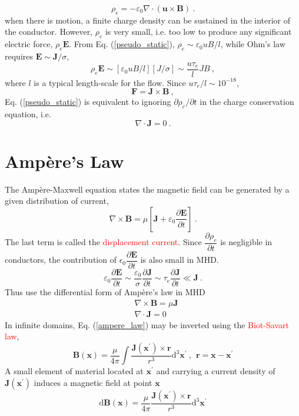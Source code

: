 \documentclass[12pt,a4paper]{article}
\renewcommand{\vec}[1]{\boldsymbol{#1}}
\newcommand{\dif}{\mathrm{d}}
\begin{document}
\begin{equation}
\rho_e = -\varepsilon_0 \nabla \cdot (\vec{u}\times \vec{B}) ~.
\label{pseudo_static}
\end{equation}
when there is motion, a finite charge density can be sustained in the interior of the conductor. However, $\rho_e$ is very small, i.e. too low to produce any significant electric force, $\rho_e \vec{E}$. From Eq. (\ref{pseudo_static}), $\rho_e \sim \varepsilon_0 u B /l$, while Ohm's law requires $\vec{E} \sim \vec{J}/\sigma$,
\begin{equation*}
\rho_e \vec{E} \sim [\varepsilon_0 u B /l ] [J/\sigma] \sim \frac{u\tau_e}{l} J B ~,
\end{equation*}
where $l$ is a typical length-scale for the flow.  Since $u\tau_e/l \sim 10^{-18}$, 
\begin{equation}
\vec{F} = \vec{J} \times \vec{B} ~,
\end{equation}
Eq. (\ref{pseudo_static}) is equivalent to ignoring $\partial \rho_e/\partial t$  in the charge conservation equation, i.e.
\begin{equation}
\nabla \cdot \vec{J} = 0 ~.
\end{equation}

\section{Amp\`ere's Law}
The Amp\`ere-Maxwell equation states the magnetic field can be generated by a given distribution of current,
\begin{equation}
\nabla \times \vec{B} = \mu \left[\vec{J} +\varepsilon_0 \frac{\partial \vec{E}}{\partial t} \right] ~.
\end{equation}
The last term is called the \textcolor{red}{displacement current}. Since $\dfrac{\partial \rho_e}{\partial t}$ is negligible in conductors, the contribution of $\epsilon_0 \dfrac{\partial \vec{E}}{\partial t}$ is also small in MHD.
\begin{equation*}
\varepsilon_0 \dfrac{\partial \vec{E}}{\partial t} \sim \dfrac{\varepsilon_0}{\sigma} \dfrac{\partial \vec{J}}{\partial t} \sim \tau_e \dfrac{\partial \vec{J}}{\partial t} \ll \vec{J} ~.
\end{equation*}
Thus use the differential form of Amp\`ere's law in MHD
\begin{align}
& \nabla \times \vec{B} = \mu \vec{J} \label{ampere_law} \\
& \nabla \cdot \vec{J} = 0
\end{align}
In infinite domains, Eq. (\ref{ampere_law}) may be inverted using the \textcolor{red}{Biot-Savart law},
\begin{equation}
\vec{B}(\vec{x}) = \frac{\mu}{4\pi} \int \dfrac{\vec{J}(\vec{x}^\prime) \times \vec{r}}{r^3} \dif^3 \vec{x}^\prime ~, ~~ \vec{r} = \vec{x} - \vec{x}^\prime
\end{equation}
A small element of material located at $\vec{x}^\prime$ and carrying a current density of $\vec{J}(\vec{x}^\prime)$ induces a magnetic field at point $\vec{x}$
\begin{equation*}
\dif \vec{B}(\vec{x}) =  \frac{\mu}{4\pi} \dfrac{\vec{J}(\vec{x}^\prime) \times \vec{r}}{r^3} \dif^3 \vec{x}^\prime
\end{equation*}
\end{document}
